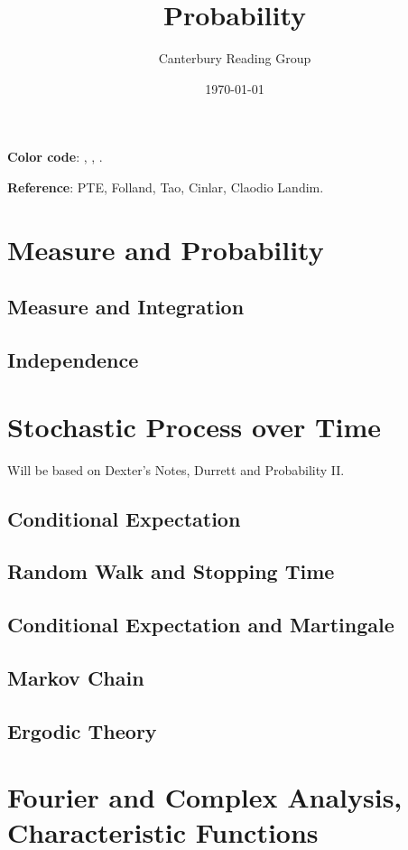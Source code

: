 \documentclass[12pt, oneside]{book}
\begin{document}
    \title{Probability}\author{Canterbury Reading Group}\date{\today}
    \setcounter{tocdepth}{3}
    \tableofcontents

    \textbf{Color code}: , , . 

    \textbf{Reference}: PTE, Folland, Tao, Cinlar, Claodio Landim.
    \chapter{Measure and Probability}  
        \section{Measure and Integration}
        \section{Independence}
    \chapter{Stochastic Process over Time}
        Will be based on Dexter's Notes, Durrett and Probability II.
        \section{Conditional Expectation}
        \section{Random Walk and Stopping Time}
        \section{Conditional Expectation and Martingale}
        \section{Markov Chain}
        \section{Ergodic Theory}
    \appendix
    \chapter{Fourier and Complex Analysis, Characteristic Functions}
\end{document}
